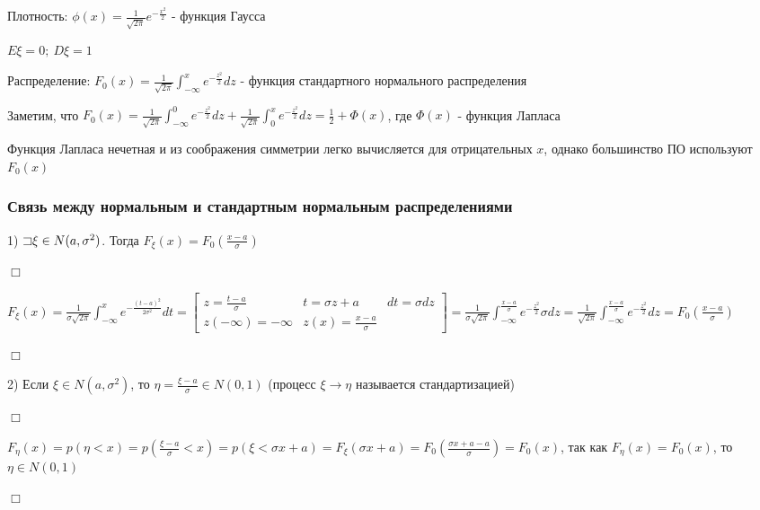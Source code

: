 \documentclass[12pt]{article}
\begin{document}
    Плотность: $\phi(x) = \frac{1}{\sqrt{2\pi}} e^{-\frac{x^2}{2}}$ - функция Гаусса

    $E\xi = 0; \ D\xi = 1$

    Распределение: $F_0(x) = \frac{1}{\sqrt{2\pi}} \int_{-\infty}^x e^{-\frac{z^2}{2}} dz$ - функция стандартного нормального распределения

    Заметим, что $F_0(x) = \frac{1}{\sqrt{2\pi}} \int_{-\infty}^0 e^{-\frac{z^2}{2}} dz + \frac{1}{\sqrt{2\pi}} \int_0^x e^{-\frac{z^2}{2}} dz = \frac{1}{2} + \Phi(x)$, где $\Phi(x)$ - функция Лапласа

    Функция Лапласа нечетная и из соображения симметрии легко вычисляется для отрицательных $x$, однако большинство ПО используют $F_0(x)$
    
    \hypertarget{connectionbetweennormalandstandard}{}

    \subsubsection{Связь между нормальным и стандартным нормальным распределениями}

    1) $\mathord{\sqsupset} \xi \in N(a, \sigma^2)$. Тогда $F_\xi(x) = F_0\left(\frac{x - a}{\sigma}\right)$

    \begin{MyProof}
        $\Box$
        
        $F_\xi(x) = \frac{1}{\sigma\sqrt{2\pi}} \int_{-\infty}^x e^{-\frac{(t - a)^2}{2\sigma^2}} dt = \left[\begin{matrix}z = \frac{t - a}{\sigma} & t = \sigma z + a & dt = \sigma dz \\ z (-\infty) = -\infty & z(x) = \frac{x - a}{\sigma} & \end{matrix}\right] = 
        \frac{1}{\sigma\sqrt{2\pi}} \int_{-\infty}^\frac{x - a}{\sigma} e^{-\frac{z^2}{2}} \sigma dz = \frac{1}{\sqrt{2\pi}} \int_{-\infty}^\frac{x - a}{\sigma} e^{-\frac{z^2}{2}} dz = F_0\left(\frac{x - a}{\sigma}\right)$
        
        $\Box$
    \end{MyProof}

    2) Если $\xi \in N(a, \sigma^2)$, то $\eta = \frac{\xi - a}{\sigma} \in N(0, 1)$ (процесс $\xi \to \eta$ называется стандартизацией)

    \begin{MyProof}
        $\Box$
        
        $F_\eta(x) = p(\eta < x) = p\left(\frac{\xi - a}{\sigma} < x\right) = p(\xi < \sigma x + a) = F_\xi(\sigma x + a) = F_0\left(\frac{\sigma x + a - a}{\sigma}\right) = F_0(x)$, так как $F_\eta(x) = F_0(x)$, то $\eta \in N(0, 1)$
        
        $\Box$
    \end{MyProof}
\end{document}
